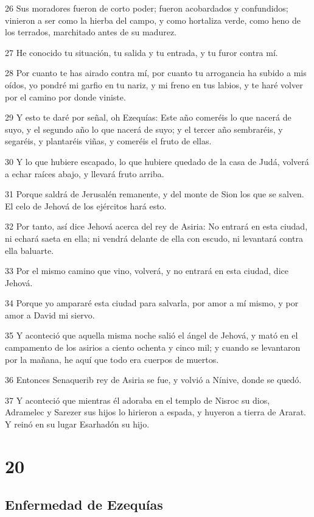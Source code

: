 \par 26 Sus moradores fueron de corto poder; fueron acobardados y confundidos; vinieron a ser como la hierba del campo, y como hortaliza verde, como heno de los terrados, marchitado antes de su madurez.
\par 27 He conocido tu situación, tu salida y tu entrada, y tu furor contra mí.
\par 28 Por cuanto te has airado contra mí, por cuanto tu arrogancia ha subido a mis oídos, yo pondré mi garfio en tu nariz, y mi freno en tus labios, y te haré volver por el camino por donde viniste.
\par 29 Y esto te daré por señal, oh Ezequías: Este año comeréis lo que nacerá de suyo, y el segundo año lo que nacerá de suyo; y el tercer año sembraréis, y segaréis, y plantaréis viñas, y comeréis el fruto de ellas.
\par 30 Y lo que hubiere escapado, lo que hubiere quedado de la casa de Judá, volverá a echar raíces abajo, y llevará fruto arriba.
\par 31 Porque saldrá de Jerusalén remanente, y del monte de Sion los que se salven. El celo de Jehová de los ejércitos hará esto.
\par 32 Por tanto, así dice Jehová acerca del rey de Asiria: No entrará en esta ciudad, ni echará saeta en ella; ni vendrá delante de ella con escudo, ni levantará contra ella baluarte.
\par 33 Por el mismo camino que vino, volverá, y no entrará en esta ciudad, dice Jehová.
\par 34 Porque yo ampararé esta ciudad para salvarla, por amor a mí mismo, y por amor a David mi siervo.
\par 35 Y aconteció que aquella misma noche salió el ángel de Jehová, y mató en el campamento de los asirios a ciento ochenta y cinco mil; y cuando se levantaron por la mañana, he aquí que todo era cuerpos de muertos.
\par 36 Entonces Senaquerib rey de Asiria se fue, y volvió a Nínive, donde se quedó.
\par 37 Y aconteció que mientras él adoraba en el templo de Nisroc su dios, Adramelec y Sarezer sus hijos lo hirieron a espada, y huyeron a tierra de Ararat. Y reinó en su lugar Esarhadón su hijo.

\chapter{20}

\section*{Enfermedad de Ezequías}

